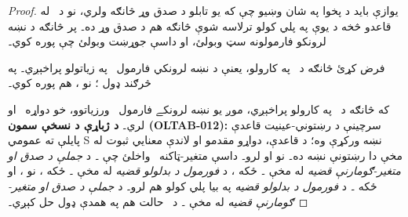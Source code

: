 \documentclass[12pt,a4paper,oneside]{report}
\theoremstyle{definition}
\begin{document}
\label{olpseg:OLP-0111-B007:start}
\begin{proof}
يوازې بايد د پخوا په شان وښيو چې که يو تابلو د صدق وړ
څانګه ولري، نو د~\LR{$\eq$} له قاعدو څخه د يوې په پلي کولو ترلاسه شوې
څانګه هم د صدق وړ ده۔ \LR{$\Gamma$} پر څانګه د نښه لرونکو فارمولونه
سټ وبولئ، او  داسې جوړښت وبولئ چې \LR{$\Gamma$}
پوره کوي۔
\label{olpseg:OLP-0111-B007:end}

\label{olpseg:OLP-0111-B008:start}
فرض کړئ څانګه د~\LR{$\eq$} په کارولو، يعنې د نښه لرونکي
فارمول~\LR{$\sFmla{\True}{\eq[t][t]}$} په زياتولو پراخېږي۔ په
څرګند ډول ؛ نو ،
\LR{$\Gamma \cup \{\sFmla{\True}{\eq[t][t]}\}$} هم پوره کوي۔
\label{olpseg:OLP-0111-B008:end}

\label{olpseg:OLP-0111-B009:start}
که څانګه د~\LR{$\TRule{\True}{\eq}$} په کارولو پراخېږي، موږ يو نښه
لرونکے فارمول~ ورزياتوو، خو \LR{$\Gamma$}
دواړه~\LR{$\sFmla{\True}{\eq[t_1][t_2]}$} او
 لري۔
\textbf{د ژباړې د نسخې سمون (OLTAB-012):} سرچينې د رښتوني-عينيت
قاعدې پايلې ته عمومي S نښه ورکړې وه؛ د قاعدې، دواړو مقدمو او
لاندې معنايي ثبوت له مخې دا رښتونې نښه ده۔
نو  او  لرو۔ داسې
متغير-ټاکنه~ واخلئ چې ۔ د
\emph{جملې د صدق او متغير-ګومارنې قضيه}\nobreakspace{} له مخې
۔ ځکه ، د
\emph{فورمول د بدلولو قضيه}\nobreakspace{} له مخې ۔
ځکه ، نو
، او ځکه
۔ د
\emph{فورمول د بدلولو قضيه}\nobreakspace{} په بيا پلي کولو
 هم لرو۔ د
\emph{جملې د صدق او متغير-ګومارنې قضيه}\nobreakspace{} له مخې
۔ د~\LR{$\TRule{\False}{\eq}$} حالت هم په همدې ډول
حل کېږي۔
\end{proof}
\label{olpseg:OLP-0111-B009:end}
\end{document}
